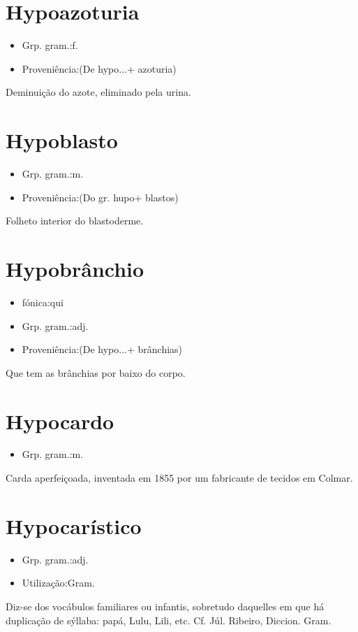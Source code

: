 \documentclass{article}
\begin{document}
\section{Hypoazoturia}
\begin{itemize}
\item {Grp. gram.:f.}
\end{itemize}
\begin{itemize}
\item {Proveniência:(De \textunderscore hypo...\textunderscore  + \textunderscore azoturia\textunderscore )}
\end{itemize}
Deminuição do azote, eliminado pela urina.
\section{Hypoblasto}
\begin{itemize}
\item {Grp. gram.:m.}
\end{itemize}
\begin{itemize}
\item {Proveniência:(Do gr. \textunderscore hupo\textunderscore  + \textunderscore blastos\textunderscore )}
\end{itemize}
Folheto interior do blastoderme.
\section{Hypobrânchio}
\begin{itemize}
\item {fónica:qui}
\end{itemize}
\begin{itemize}
\item {Grp. gram.:adj.}
\end{itemize}
\begin{itemize}
\item {Proveniência:(De \textunderscore hypo...\textunderscore  + \textunderscore brânchias\textunderscore )}
\end{itemize}
Que tem as brânchias por baixo do corpo.
\section{Hypocardo}
\begin{itemize}
\item {Grp. gram.:m.}
\end{itemize}
Carda aperfeiçoada, inventada em 1855 por um fabricante de tecidos em Colmar.
\section{Hypocarístico}
\begin{itemize}
\item {Grp. gram.:adj.}
\end{itemize}
\begin{itemize}
\item {Utilização:Gram.}
\end{itemize}
Diz-se dos vocábulos familiares ou infantis, sobretudo daquelles em que há duplicação de sýllaba: \textunderscore papá\textunderscore , \textunderscore Lulu\textunderscore , \textunderscore Lili\textunderscore , etc. Cf. Júl. Ribeiro, \textunderscore Diccion. Gram.\textunderscore 
\end{document}
